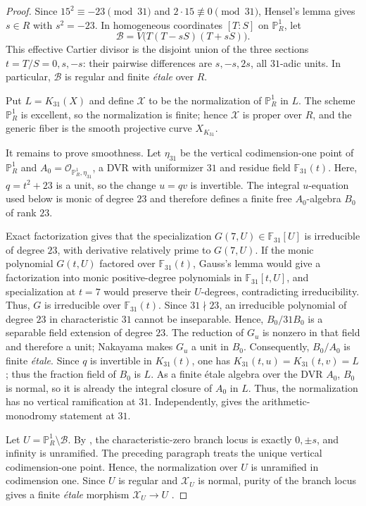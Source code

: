 \documentclass[11pt]{article}
\newcommand{\F}{\mathbb F}
\newcommand{\PP}{\mathbb P}
\begin{document}
\begin{proof}
Since $15^2\equiv-23\pmod{31}$ and $2\cdot15\not\equiv0\pmod{31}$, Hensel's lemma gives $s\in R$ with $s^2=-23$.  In homogeneous coordinates $[T:S]$ on $\PP^1_R$, let
\[
\mathcal B=V\!\bigl(T(T-sS)(T+sS)\bigr).
\]
This effective Cartier divisor is the disjoint union of the three sections $t=T/S=0,s,-s$: their pairwise differences are $s,-s,2s$, all $31$-adic units.  In particular, $\mathcal B$ is regular and finite \emph{\'etale} over $R$.

Put $L=K_{31}(X)$ and define $\mathcal X$ to be the normalization of $\PP^1_R$ in $L$.  The scheme $\PP^1_R$ is excellent, so the normalization is finite; hence $\mathcal X$ is proper over $R$, and the generic fiber is the smooth projective curve $X_{K_{31}}$.

It remains to prove smoothness.  Let $\eta_{31}$ be the vertical codimension-one point of $\PP^1_R$ and $A_0=\mathcal O_{\PP^1_R,\eta_{31}}$, a DVR with uniformizer $31$ and residue field $\F_{31}(t)$.  Here, $q=t^2+23$ is a unit, so the change $u=qv$ is invertible.  The integral $u$-equation used below is monic of degree $23$ and therefore defines a finite free $A_0$-algebra $B_0$ of rank $23$.

Exact factorization gives that the specialization $G(7,U)\in\F_{31}[U]$ is irreducible of degree $23$, with derivative relatively prime to $G(7,U)$.  If the monic polynomial $G(t,U)$ factored over $\F_{31}(t)$, Gauss's lemma would give a factorization into monic positive-degree polynomials in $\F_{31}[t,U]$, and specialization at $t=7$ would preserve their $U$-degrees, contradicting irreducibility.  Thus, $G$ is irreducible over $\F_{31}(t)$.  Since $31\nmid23$, an irreducible polynomial of degree $23$ in characteristic $31$ cannot be inseparable.  Hence, $B_0/31B_0$ is a separable field extension of degree $23$.  The reduction of $G_u$ is nonzero in that field and therefore a unit; Nakayama makes $G_u$ a unit in $B_0$.  Consequently, $B_0/A_0$ is finite \emph{\'etale}.  Since $q$ is invertible in $K_{31}(t)$, one has $K_{31}(t,u)=K_{31}(t,v)=L$; thus the fraction field of $B_0$ is $L$.  As a finite \'etale algebra over the DVR $A_0$, $B_0$ is normal, so it is already the integral closure of $A_0$ in $L$.  Thus, the normalization has no vertical ramification at $31$.  Independently, \cite[Proposition~3.5]{HJLPPZ2026} gives the arithmetic-monodromy statement at $31$.

Let $U=\PP^1_R\setminus\mathcal B$.  By \cite[Proposition~3.5]{HJLPPZ2026}, the characteristic-zero branch locus is exactly $0,\pm s$, and infinity is unramified.  The preceding paragraph treats the unique vertical codimension-one point.  Hence, the normalization over $U$ is unramified in codimension one.  Since $U$ is regular and $\mathcal X_U$ is normal, purity of the branch locus gives a finite \emph{\'etale} morphism $\mathcal X_U\to U$ \cite[Tag~0BMB]{StacksProject}.


\end{proof}
\end{document}
